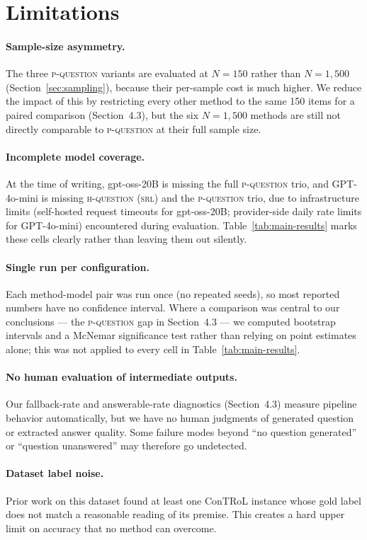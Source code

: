 \documentclass[11pt]{article}
\begin{document}
\section*{Limitations}

\paragraph{Sample-size asymmetry.}
The three \textsc{p-question} variants are evaluated at $N=150$ rather than
$N=1{,}500$ (Section~\ref{sec:sampling}), because their per-sample cost is
much higher. We reduce the impact of this by restricting every other method
to the same 150 items for a paired comparison (Section~4.3), but the six
$N=1{,}500$ methods are still not directly comparable to \textsc{p-question}
at their full sample size.

\paragraph{Incomplete model coverage.}
At the time of writing, gpt-oss-20B is missing the full \textsc{p-question}
trio, and GPT-4o-mini is missing \textsc{h-question (srl)} and the
\textsc{p-question} trio, due to infrastructure limits (self-hosted request
timeouts for gpt-oss-20B; provider-side daily rate limits for GPT-4o-mini)
encountered during evaluation. Table~\ref{tab:main-results} marks these
cells clearly rather than leaving them out silently.

\paragraph{Single run per configuration.}
Each method-model pair was run once (no repeated seeds), so most reported
numbers have no confidence interval. Where a comparison was central to our
conclusions --- the \textsc{p-question} gap in Section~4.3 --- we computed
bootstrap intervals and a McNemar significance test rather than relying on
point estimates alone; this was not applied to every cell in
Table~\ref{tab:main-results}.

\paragraph{No human evaluation of intermediate outputs.}
Our fallback-rate and answerable-rate diagnostics (Section~4.3) measure
pipeline behavior automatically, but we have no human judgments of generated
question or extracted answer quality. Some failure modes beyond ``no question
generated'' or ``question unanswered'' may therefore go undetected.

\paragraph{Dataset label noise.}
Prior work on this dataset found at least one ConTRoL instance whose gold
label does not match a reasonable reading of its premise. This creates a
hard upper limit on accuracy that no method can overcome.



\end{document}
